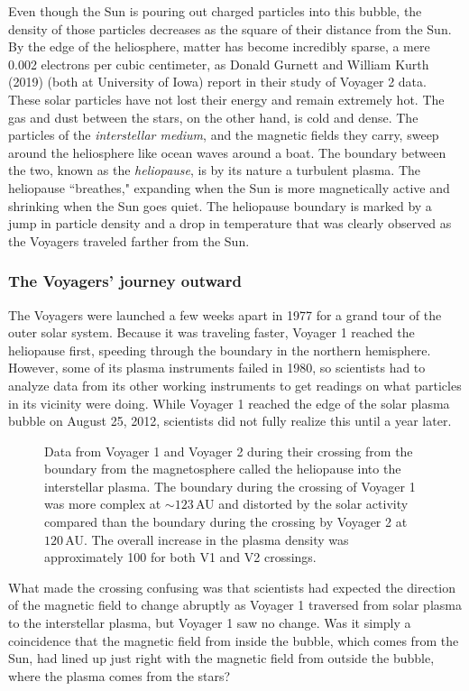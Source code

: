 \documentclass[a4paper,openany,12pt]{book}
\begin{document}
Even though the Sun is pouring out charged particles into this bubble, the density of those particles decreases as the square of their distance from the Sun. By the edge of the heliosphere, matter has become incredibly sparse, a mere 0.002 electrons per cubic centimeter, as Donald Gurnett and William Kurth (2019) (both at University of Iowa) report in their study of Voyager 2 data. These solar particles have not lost their energy and remain extremely hot. The gas and dust between the stars, on the other hand, is cold and dense. The particles of the \emph{interstellar medium}, and the magnetic fields they carry, sweep around the heliosphere like ocean waves around a boat. The boundary between the two, known as the \emph{heliopause}, is by its nature a turbulent plasma. The heliopause ``breathes," expanding when the Sun is more magnetically active and shrinking when the Sun goes quiet. The heliopause boundary is marked by a jump in particle density and a drop in temperature that was clearly observed as the Voyagers traveled farther from the Sun.

\subsubsection{The Voyagers' journey outward}

The Voyagers were launched a few weeks apart in 1977 for a grand tour of the outer solar system.  Because it was traveling faster, Voyager 1 reached the heliopause first, speeding through the boundary in the northern hemisphere. However, some of its plasma instruments failed in 1980, so scientists had to analyze data from its other working instruments to get readings on what particles in its vicinity were doing. While Voyager 1 reached the edge of the solar plasma bubble on August 25, 2012, scientists did not fully realize this until a year later.
%
\begin{figure}[H]
\centerline{}
\caption{Data from Voyager 1 and Voyager 2 during their crossing from the boundary from the magnetosphere called the heliopause into the interstellar plasma. The boundary during the crossing of Voyager 1 was more complex at $\sim 123\,$AU and distorted by the solar activity compared than the boundary during the crossing by Voyager 2 at $120\,$AU. The overall increase in the plasma density was approximately 100 for both V1 and V2 crossings.}
\label{densities}
\end{figure}
%

What made the crossing confusing was that scientists had expected the direction of the magnetic field to change abruptly as Voyager 1 traversed from solar plasma to the interstellar plasma, but Voyager 1 saw no change. Was it simply a coincidence that the magnetic field from inside the bubble, which comes from the Sun, had lined up just right with the magnetic field from outside the bubble, where the plasma comes from the stars?
\end{document}
